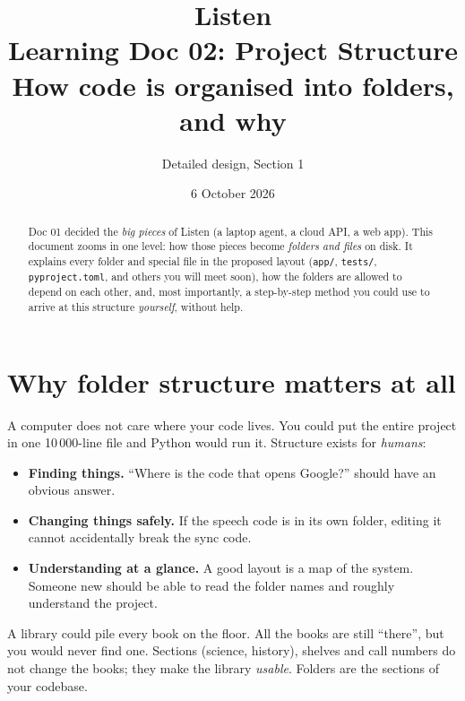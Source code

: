\documentclass[11pt,a4paper]{article}
\title{\textbf{Listen}\\[4pt]\large Learning Doc 02: Project Structure\\
       \normalsize How code is organised into folders, and why}
\author{Detailed design, Section 1}
\date{6 October 2026}
\begin{document}
\maketitle

\begin{abstract}
\noindent Doc 01 decided the \emph{big pieces} of Listen (a laptop agent, a cloud API, a web
app). This document zooms in one level: how those pieces become \emph{folders and files} on
disk. It explains every folder and special file in the proposed layout (\texttt{app/},
\texttt{tests/}, \texttt{pyproject.toml}, and others you will meet soon), how the folders are
allowed to depend on each other, and, most importantly, a step-by-step method you could use
to arrive at this structure \emph{yourself}, without help.
\end{abstract}

\tableofcontents
\newpage

\section{Why folder structure matters at all}

A computer does not care where your code lives. You could put the entire project in one
10\,000-line file and Python would run it. Structure exists for \emph{humans}:

\begin{itemize}[nosep]
  \item \textbf{Finding things.} ``Where is the code that opens Google?'' should have an
        obvious answer.
  \item \textbf{Changing things safely.} If the speech code is in its own folder, editing it
        cannot accidentally break the sync code.
  \item \textbf{Understanding at a glance.} A good layout is a map of the system. Someone
        new should be able to read the folder names and roughly understand the project.
\end{itemize}

\begin{analogy}
A library could pile every book on the floor. All the books are still ``there'', but you
would never find one. Sections (science, history), shelves and call numbers do not change the
books; they make the library \emph{usable}. Folders are the sections of your codebase.
\end{analogy}
\end{document}
